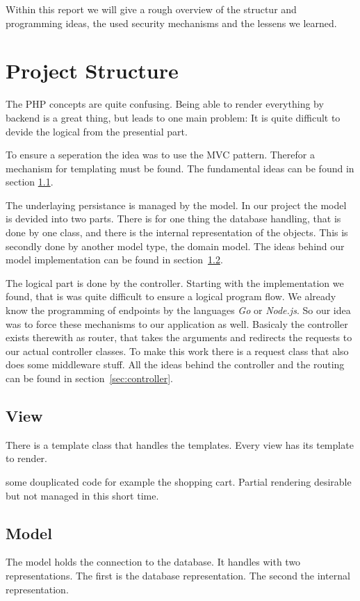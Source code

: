 \documentclass[a4paper]{spie}
\newcommand{\php}{PHP\xspace}
\begin{document}
Within this report we will give a rough overview of the structur and programming ideas, the used security mechanisms and the lessens we learned.
\section{Project Structure}
The {\php} concepts are quite confusing.
Being able to render everything by backend is a great thing, but leads to one main problem:
It is quite difficult to devide the logical from the presential part.

To ensure a seperation the idea was to use the \ac{MVC} pattern.
Therefor a mechanism for templating must be found.
The fundamental ideas can be found in section \ref{sec:view}.

The underlaying persistance is managed by the model.
In our project the model is devided into two parts.
There is for one thing the database handling, that is done by one class, and there is the internal representation of the objects.
This is secondly done by another model type, the domain model.
The ideas behind our model implementation can be found in section~\ref{sec:model}.

The logical part is done by the controller.
Starting with the implementation we found, that is was quite difficult to ensure a logical program flow.
We already know the programming of endpoints by the languages \emph{Go} or \emph{Node.js}.
So our idea was to force these mechanisms to our application as well.
Basicaly the controller exists therewith as router, that takes the arguments and redirects the requests to our actual controller classes. To make this work there is a request class that also does some middleware stuff. All the ideas behind the controller and the routing can be found in section~\ref{sec:controller}.
\subsection{View}\label{sec:view}
There is a template class that handles the templates.
Every view has its template to render.

some douplicated code for example the shopping cart.
Partial rendering desirable but not managed in this short time.

\subsection{Model}\label{sec:model}
The model holds the connection to the database.
It handles with two representations.
The first is the database representation.
The second the internal representation.
\end{document}
